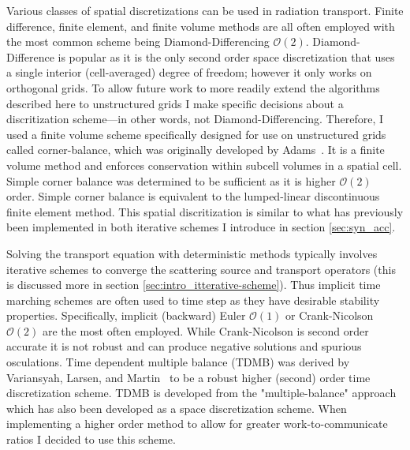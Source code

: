 Various classes of spatial discretizations can be used in radiation transport.
Finite difference, finite element, and finite volume methods are all often employed with the most common scheme being Diamond-Differencing $\mathcal{O}(2)$.
Diamond-Difference is popular as it is the only second order space discretization that uses a single interior (cell-averaged) degree of freedom; however it only works on orthogonal grids.
To allow future work to more readily extend the algorithms described here to unstructured grids I make specific decisions about a discritization scheme---in other words, not Diamond-Differencing.
Therefore, I used a finite volume scheme specifically designed for use on unstructured grids called corner-balance, which was originally developed by Adams~\cite{adams_subcell_1997}.
It is a finite volume method and enforces conservation within subcell volumes in a spatial cell.
Simple corner balance was determined to be sufficient as it is higher $\mathcal{O}(2)$ order.
Simple corner balance is equivalent to the lumped-linear discontinuous finite element method.
This spatial discritization is similar to what has previously been implemented in both iterative schemes I introduce in section \ref{sec:syn_acc}.

Solving the transport equation with deterministic methods typically involves iterative schemes to converge the scattering source and transport operators (this is discussed more in section \ref{sec:intro_itterative-scheme}).
Thus implicit time marching schemes are often used to time step as they have desirable stability properties.
Specifically, implicit (backward) Euler $\mathcal{O}(1)$ or Crank-Nicolson $\mathcal{O}(2)$ are the most often employed.
While Crank-Nicolson is second order accurate it is not robust and can produce negative solutions and spurious osculations.
Time dependent multiple balance (TDMB) was derived by Variansyah, Larsen, and Martin~\cite{variansyah_robust_2021} to be a robust higher (second) order time discretization scheme.
TDMB is developed from the "multiple-balance" approach which has also been developed as a space discretization scheme.
When implementing a higher order method to allow for greater work-to-communicate ratios I decided to use this scheme. 

